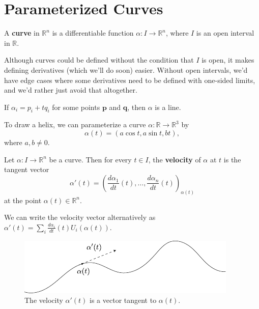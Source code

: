 \documentclass[10pt]{report}
\begin{document}

\section{Parameterized Curves}

\begin{defn}
A \textbf{curve} in $\mathbb{R}^n$ is a differentiable function $\alpha:I\to \mathbb{R}^n$, where $I$ is an open interval in $\mathbb{R}$.
\end{defn}

Although curves could be defined without the condition that $I$ is open, it makes defining derivatives (which we'll do soon) easier. Without open intervals, we'd have edge cases where some derivatives need to be defined with one-sided limits, and we'd rather just avoid that altogether.

\begin{ex}{}{}
If $\alpha_i = p_i + t q_i$ for some points $\mathbf{p}$ and $\mathbf{q}$, then $\alpha$ is a line.
\end{ex}

\pagebreak

\begin{ex}
	To draw a helix, we can parameterize a curve $\alpha:\mathbb{R}\to \mathbb{R}^3$ by 
	\[
		\alpha(t)=(a \cos t, a \sin t, bt),
	\] where $a, b\neq 0$.
\end{ex}

\begin{defn}
Let $\alpha:I\to \mathbb{R}^n$ be a curve. Then for every $t \in I$, the \textbf{velocity} of $\alpha$ at $t$ is the tangent vector
\[
	\alpha'(t) = \left( \frac{d \alpha_1}{d t} (t), \dots, \frac{d \alpha_n}{d t} (t) \right)_{\alpha(t)}
\] at the point $\alpha(t) \in \mathbb{R}^n$.
\end{defn}

We can write the velocity vector alternatively as $\alpha'(t) = \sum_i \frac{d \alpha_i}{d t} (t) U_i(\alpha(t))$.

\begin{figure}[H]
	\centering
	\includegraphics[scale=1]{fig/velocity.pdf}
	\caption{The velocity $\alpha'(t)$ is a vector tangent to $\alpha(t)$.}
\end{figure}
\end{document}
